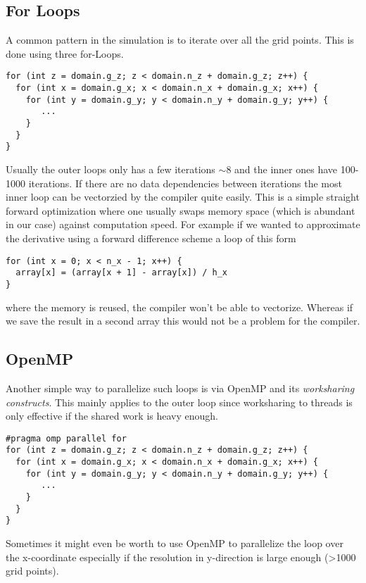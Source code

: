 \documentclass[master.tex]{subfiles}
\begin{document}
\subsection{For Loops}
A common pattern in the simulation is to iterate over all the grid points.
This is done using three for-Loops.
\begin{lstlisting}
for (int z = domain.g_z; z < domain.n_z + domain.g_z; z++) {
  for (int x = domain.g_x; x < domain.n_x + domain.g_x; x++) {
    for (int y = domain.g_y; y < domain.n_y + domain.g_y; y++) {
       ...
    }
  }
}
\end{lstlisting}
Usually the outer loops only has a few iterations $\sim 8$ and the inner ones have 100-1000 iterations. 
If there are no data dependencies between iterations the most inner loop can be vectorzied by the compiler quite easily. This is a simple straight forward optimization where one usually swaps memory space (which is abundant in our case) against computation speed. For example if we wanted to approximate the derivative using a forward difference scheme a loop of this form
\begin{lstlisting}
for (int x = 0; x < n_x - 1; x++) {
  array[x] = (array[x + 1] - array[x]) / h_x    
}
\end{lstlisting}
where the memory is reused, the compiler won't be able to vectorize. Whereas if we save the result in a second array this would not be a problem for the compiler.
\subsection{OpenMP} \label{sec:open-mp-method}
Another simple way to parallelize such loops is via OpenMP and its \textit{worksharing constructs}. This mainly applies to the outer loop since worksharing to threads is only effective if the shared work is heavy enough.
\begin{lstlisting}
#pragma omp parallel for
for (int z = domain.g_z; z < domain.n_z + domain.g_z; z++) {
  for (int x = domain.g_x; x < domain.n_x + domain.g_x; x++) {
    for (int y = domain.g_y; y < domain.n_y + domain.g_y; y++) {
       ...
    }
  }
}
\end{lstlisting}
Sometimes it might even be worth to use OpenMP to parallelize the loop over the x-coordinate especially if the resolution in y-direction is large enough (\textgreater 1000 grid points).
\end{document}
